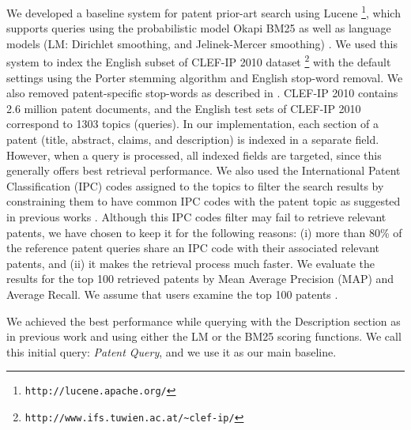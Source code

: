 We developed a baseline system for patent prior-art search using
Lucene%
\footnote{\texttt{http://lucene.apache.org/}%
}, which supports queries using the probabilistic
model Okapi BM25 \cite{Robertson1993} as well as language models (LM: Dirichlet
smoothing, and Jelinek-Mercer smoothing) \cite{Zhai2001}. We used
this system to index the English subset of CLEF-IP 2010 dataset%
\footnote{\texttt{http://www.ifs.tuwien.ac.at/\textasciitilde{}clef-ip/}%
} with the default settings using the Porter stemming algorithm \cite{Porter1980} and English stop-word removal. 
We also removed patent-specific stop-words as described in \cite{magdy2012toward}.
CLEF-IP 2010 contains 2.6 million patent documents, and the English
test sets of CLEF-IP 2010 correspond to 1303 topics (queries). In
our implementation, each section of a patent (title, abstract, claims,
and description) is indexed in a separate field. However, when a query
is processed, all indexed fields are targeted, since this generally
offers best retrieval performance. We also used the International
Patent Classification (IPC) codes assigned to the topics to filter
the search results by constraining them to have common IPC codes with
the patent topic as suggested in previous works \cite{lopez2010patatras}.
Although this IPC codes filter may fail to retrieve relevant patents, we
have chosen to keep it for the following reasons: (i) more than 80\%
of the reference patent queries share an IPC code with their associated relevant
patents, and (ii) it makes the retrieval process much faster. We evaluate
the results for the top 100 retrieved patents by Mean Average Precision
(MAP) and Average Recall. We assume that users examine the top 100
patents \cite{joho2010survey}.

We achieved the best performance while querying with the Description
section as in previous work \cite{xue2009transforming} and using
either the LM or the BM25 scoring functions. We call this initial
query: \emph{Patent Query}, and we use it as our main baseline.

